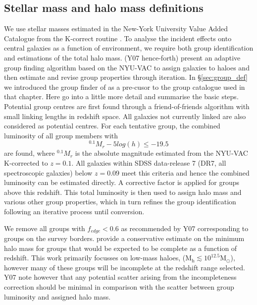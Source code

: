 \subsection{Stellar mass and halo mass definitions} \label{sec:mass_hab}
We use stellar masses estimated in the New-York University Value Added Catalogue from the K-correct routine \citep[NYU-VAC;][]{blanton2005}. To analyse the incident effects onto central galaxies as a function of environment, we require both group identification and estimations of the total halo mass. \citet{yang2007} (Y07 hence-forth) present an adaptive group finding algorithm based on the NYU-VAC to assign galaxies to haloes and then estimate and revise group properties through iteration. In \S\ref{sec:group_def} we introduced the group finder of \citet{yang2007} as a pre-cusor to the group catalogue \citep{lim2017} used in that chapter. Here go into a little more detail and summarise the basic steps. Potential group centres are first found through a friend-of-friends algorithm with small linking lengths in redshift space. All galaxies not currently linked are also considered as potential centres. For each tentative group, the combined luminosity of all group members with 
\begin{equation}
^{0.1}M_r - 5log(h) \leq -19.5
\end{equation}
are found, where $^{0.1}M_r$ is the absolute magnitude estimated from the NYU-VAC K-corrected to $z=0.1$. All galaxies within SDSS data-release 7 (DR7, all spectroscopic galaxies) below $z=0.09$ meet this criteria and hence the combined luminosity can be estimated directly. A corrective factor is applied for groups above this redshift. This total luminosity is then used to assign halo mass and various other group properties, which in turn refines the group identification following an iterative process until conversion. 

We remove all groups with $f_{edge} < 0.6$ as recommended by Y07 corresponding to groups on the survey borders. \citet{yang2009} provide a conservative estimate on the minimum halo mass for groups that would be expected to be complete as a function of redshift. This work primarily focusses on low-mass haloes, ($\mathrm{M_h \lesssim 10^{12.5} M_{\odot}}$), however many of these groups will be incomplete at the redshift range selected. Y07 note however that any potential scatter arising from the incompleteness correction should be minimal in comparison with the scatter between group luminosity and assigned halo mass. 

